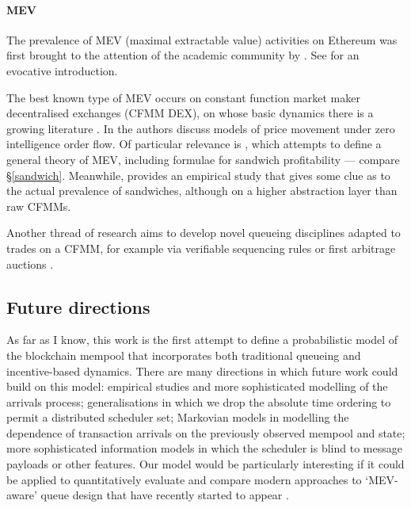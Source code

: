 \documentclass[a4paper,11pt]{article}
\begin{document}
\paragraph{MEV} The prevalence of MEV (maximal extractable value) activities on Ethereum was first brought to the attention of the academic community by \cite{daian2020flash}. See \cite{robinson2020ethereum} for an evocative introduction. 

The best known type of MEV occurs on constant function market maker decentralised exchanges (CFMM DEX), on whose basic dynamics there is a growing literature \cite{angeris2020improved, angeris2022constant, xu2022sok}.
%
In \cite{goyal2022finding} the authors discuss models of price movement under zero intelligence order flow.
%
Of particular relevance is \cite{kulkarni2022towards}, which attempts to define a general theory of MEV, including formulae for sandwich profitability --- compare \S\ref{sandwich}.
%
Meanwhile, \cite{0xblog2022measuring} provides an empirical study that gives some clue as to the actual prevalence of sandwiches, although on a higher abstraction layer than raw CFMMs.

Another thread of research aims to develop novel queueing disciplines adapted to trades on a CFMM, for example via verifiable sequencing rules \cite{ferreira2022credible} or first arbitrage auctions \cite{josojo2022mev,nikete2022towards}.

\subsection{Future directions}
\label{future-directions}
As far as I know, this work is the first attempt to define a probabilistic model of the blockchain mempool that incorporates both traditional queueing and incentive-based dynamics.
%
There are many directions in which future work could build on this model: empirical studies and more sophisticated modelling of the arrivals process; generalisations in which we drop the absolute time ordering to permit a distributed scheduler set; Markovian models in modelling the dependence of transaction arrivals on the previously observed mempool and state; more sophisticated information models in which the scheduler is blind to message payloads or other features.
%
Our model would be particularly interesting if it could be applied to quantitatively evaluate and compare modern approaches to `MEV-aware' queue design that have recently started to appear \cite{ferreira2022credible,josojo2022mev,nikete2022towards}.
\end{document}
